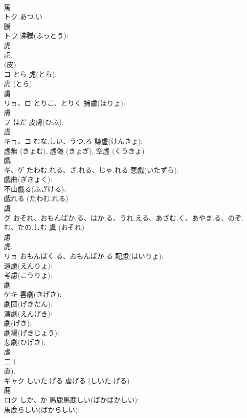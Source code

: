 \documentclass[8pt]{extreport}
\begin{document}
\begin{CJK}{UTF8}{min}
\\	篤			
\\	トク	あつ.い		
\\	騰			
\\	トウ		沸騰(ふっとう): 
\\	虎			
\\	虍, 
\\	(皮) 
\\	コ	とら	虎(とら): 
\\	虎 (とら)
\\	虜			
\\	リョ、ロ	とりこ、とりく	捕虜(ほりょ): 
\\	膚			
\\	フ	はだ	皮膚(ひふ): 
\\	虚			
\\	キョ、コ	むな.しい、うつ.ろ	謙虚(けんきょ): 
\\	虚無 (きょむ), 虚偽 (きょぎ), 空虚 (くうきょ)
\\	戯			
\\	ギ、ゲ	たわむ.れる、ざ.れる、じゃ.れる	悪戯(いたずら): 
\\	戯曲(ぎきょく): 
\\	不山戯る(ふざける): 
\\	戯れる (たわむ.れる)
\\	虞			
\\	グ	おそれ、おもんぱか.る、はか.る、うれ.える、あざむ.く、あやま.る、のぞ.む、たの.しむ		虞 (おそれ)
\\	慮			
\\	虎.
\\	リョ	おもんぱく.る、おもんぱか.る	配慮(はいりょ): 
\\	遠慮(えんりょ): 
\\	考慮(こうりょ): 
\\	劇			
\\	ゲキ		喜劇(きげき): 
\\	劇団(げきだん): 
\\	演劇(えんげき): 
\\	劇(げき): 
\\	劇場(げきじょう): 
\\	悲劇(ひげき): 
\\	虐			
\\	二＋
\\	直).
\\	ギャク	しいた.げる		虐げる (しいた.げる)
\\	鹿			
\\	ロク	しか、か	馬鹿馬鹿しい(ばかばかしい): 
\\	馬鹿らしい(ばからしい): 

\end{CJK}
\end{document}
